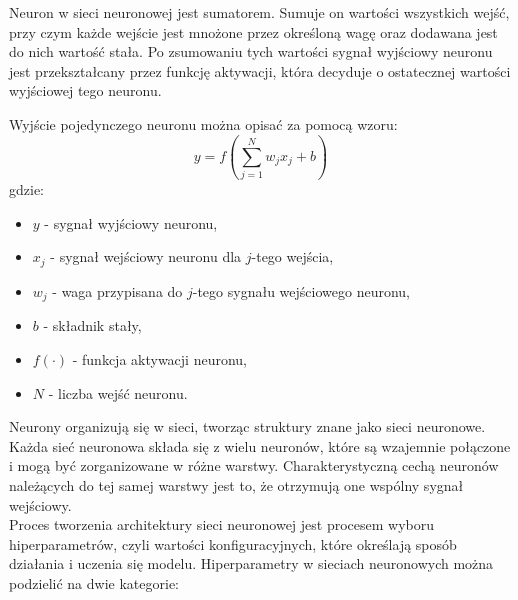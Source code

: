 \documentclass[a4paper,twoside,12pt]{book}
\begin{document}
Neuron w sieci neuronowej jest sumatorem. Sumuje on wartości wszystkich wejść, przy czym każde wejście jest mnożone przez określoną wagę oraz dodawana jest do nich wartość stała. Po zsumowaniu tych wartości sygnał wyjściowy neuronu jest przekształcany przez funkcję aktywacji, która decyduje o ostatecznej wartości wyjściowej tego neuronu.\cite{bib:ksiazka_sieci}

Wyjście pojedynczego neuronu można opisać za pomocą wzoru:
\begin{equation}
  y = f\left(\sum_{j=1}^{N} w_j x_j + b\right)
\end{equation}
gdzie:
\begin{itemize}
  \item \( y \) - sygnał wyjściowy neuronu,
  \item \( x_j \) - sygnał wejściowy neuronu dla \( j \)-tego wejścia,
  \item \( w_j \) - waga przypisana do \( j \)-tego sygnału wejściowego neuronu,
  \item \( b \) - składnik stały,
  \item \( f(\cdot) \) - funkcja aktywacji neuronu,
  \item \( N \) - liczba wejść neuronu.
\end{itemize}

Neurony organizują się w sieci, tworząc struktury znane jako sieci neuronowe. Każda sieć neuronowa składa się z wielu neuronów, które są wzajemnie połączone i mogą być zorganizowane w różne warstwy. Charakterystyczną cechą neuronów należących do tej samej warstwy jest to, że otrzymują one wspólny sygnał wejściowy.\\

Proces tworzenia architektury sieci neuronowej jest procesem wyboru hiperparametrów, czyli wartości konfiguracyjnych, które określają sposób działania i uczenia się modelu. Hiperparametry w sieciach neuronowych można podzielić na dwie kategorie:
\end{document}
